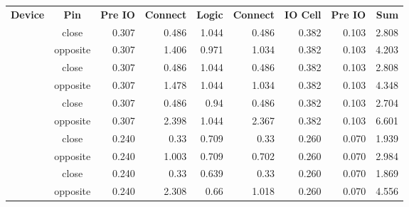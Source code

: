  
 
\renewcommand{\arraystretch}{1.5}
 \newcommand{\ct}{\color{white}\bf}
\begin{tabular}{cc*{7}{r}}
\rowcolor{Blue!50}
\ct Device & \ct Pin & \ct Pre IO & \ct Connect & \ct Logic & \ct Connect & \ct IO Cell & \ct Pre IO & \ct Sum \\
\rowcolor{white}
  & close & 0.307 & 0.486 & 1.044 & 0.486 & 0.382 & 0.103 & 2.808\\
\rowcolor{white}
 \multirow{-2}{*}{lp384} & opposite & 0.307 & 1.406 & 0.971 & 1.034 & 0.382 & 0.103 & 4.203\\
\rowcolor{blue!10}
  & close & 0.307 & 0.486 & 1.044 & 0.486 & 0.382 & 0.103 & 2.808\\
\rowcolor{blue!10}
 \multirow{-2}{*}{lp1k} & opposite & 0.307 & 1.478 & 1.044 & 1.034 & 0.382 & 0.103 & 4.348\\
\rowcolor{white}
  & close & 0.307 & 0.486 & 0.94 & 0.486 & 0.382 & 0.103 & 2.704\\
\rowcolor{white}
 \multirow{-2}{*}{lp8k} & opposite & 0.307 & 2.398 & 1.044 & 2.367 & 0.382 & 0.103 & 6.601\\
\rowcolor{blue!10}
  & close & 0.240 & 0.33 & 0.709 & 0.33 & 0.260 & 0.070 & 1.939\\
\rowcolor{blue!10}
 \multirow{-2}{*}{hx1k} & opposite & 0.240 & 1.003 & 0.709 & 0.702 & 0.260 & 0.070 & 2.984\\
\rowcolor{white}
  & close & 0.240 & 0.33 & 0.639 & 0.33 & 0.260 & 0.070 & 1.869\\
\rowcolor{white}
 \multirow{-2}{*}{hx8k} & opposite & 0.240 & 2.308 & 0.66 & 1.018 & 0.260 & 0.070 & 4.556\\
\end{tabular}
